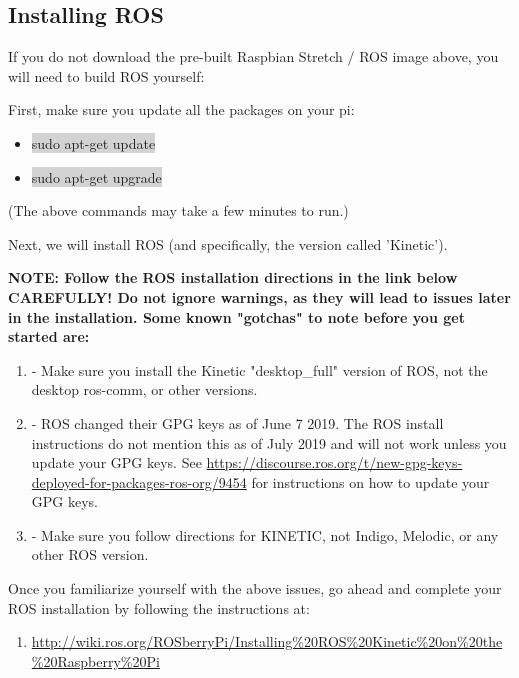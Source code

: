 \documentclass{article}
\begin{document}
\subsection{Installing ROS}
If you do not download the pre-built Raspbian Stretch / ROS image above, you will need to build ROS yourself:

First, make sure you update all the packages on your pi:
\begin{itemize}
	\item[] \colorbox{lightgray}{sudo apt-get update}
	\item[] \colorbox{lightgray}{sudo apt-get upgrade}
\end{itemize} 
(The above commands may take a few minutes to run.)

\bigskip

\noindent Next, we will install ROS (and specifically, the version called 'Kinetic').

\textbf{NOTE: Follow the ROS installation directions in the link below CAREFULLY!  Do not ignore warnings, as they will lead to issues later in the installation.  Some known "gotchas" to note before you get started are:}
\begin{enumerate}
	\item[] - Make sure you install the Kinetic "desktop\_full" version of ROS, not the desktop ros-comm, or other versions.
	\item[] - ROS changed their GPG keys as of June 7 2019.  The ROS install instructions do not mention this as of July 2019 and will not work unless you update your GPG keys. See \href{https://discourse.ros.org/t/new-gpg-keys-deployed-for-packages-ros-org/9454}{https://discourse.ros.org/t/new-gpg-keys-deployed-for-packages-ros-org/9454} for instructions on how to update your GPG keys. 
	\item[] - Make sure you follow directions for KINETIC, not Indigo, Melodic, or any other ROS version. 
\end{enumerate}

\noindent Once you familiarize yourself with the above issues, go ahead and complete your ROS installation by following the instructions at:
\begin{enumerate}
	\item[] \href{http://wiki.ros.org/ROSberryPi/Installing%20ROS%20Kinetic%20on%20the%20Raspberry%20Pi}{http://wiki.ros.org/ROSberryPi/Installing\%20ROS\%20Kinetic\%20on\%20the\%20Raspberry\%20Pi}
\end{enumerate}
\end{document}
